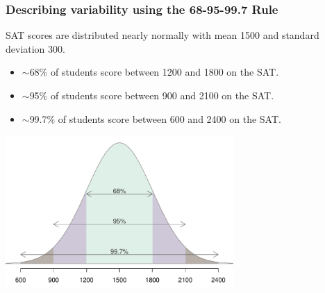 \begin{frame}
\frametitle{Describing variability using the 68-95-99.7 Rule}

SAT scores are distributed nearly normally with mean 1500 and standard deviation 300.

\pause
\begin{itemize}

\item $\sim$68\% of students score between 1200 and 1800 on the SAT. 

\item $\sim$95\% of students score between 900 and 2100 on the SAT. 

\item $\sim$99.7\% of students score between 600 and 2400 on the SAT. 

\end{itemize}

\begin{center}
\includegraphics[width=0.65\textwidth]{3-1_normal_distribution/figures/sat_empirical/sat_empirical}
\end{center}

\end{frame}


